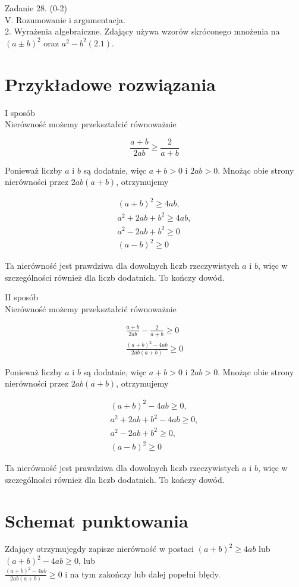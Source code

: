 \documentclass[10pt]{article}
\begin{document}
Zadanie 28. (0-2)\\
V. Rozumowanie i argumentacja.\\
2. Wyrażenia algebraiczne. Zdający używa wzorów skróconego mnożenia na $(a \pm b)^{2}$ oraz $a^{2}-b^{2}(2.1)$.

\section*{Przykładowe rozwiązania}
I sposób\\
Nierówność możemy przekształcić równoważnie

$$
\frac{a+b}{2 a b} \geq \frac{2}{a+b}
$$

Ponieważ liczby $a$ i $b$ są dodatnie, więc $a+b>0$ i $2 a b>0$. Mnożąc obie strony nierówności przez $2 a b(a+b)$, otrzymujemy

$$
\begin{gathered}
(a+b)^{2} \geq 4 a b, \\
a^{2}+2 a b+b^{2} \geq 4 a b, \\
a^{2}-2 a b+b^{2} \geq 0 \\
(a-b)^{2} \geq 0
\end{gathered}
$$

Ta nierówność jest prawdziwa dla dowolnych liczb rzeczywistych $a$ i $b$, więc w szczególności również dla liczb dodatnich. To kończy dowód.

II sposób\\
Nierówność możemy przekształcić równoważnie

$$
\begin{gathered}
\frac{a+b}{2 a b}-\frac{2}{a+b} \geq 0 \\
\frac{(a+b)^{2}-4 a b}{2 a b(a+b)} \geq 0
\end{gathered}
$$

Ponieważ liczby $a$ i $b$ są dodatnie, więc $a+b>0$ i $2 a b>0$. Mnożąc obie strony nierówności przez $2 a b(a+b)$, otrzymujemy

$$
\begin{gathered}
(a+b)^{2}-4 a b \geq 0, \\
a^{2}+2 a b+b^{2}-4 a b \geq 0, \\
a^{2}-2 a b+b^{2} \geq 0, \\
(a-b)^{2} \geq 0
\end{gathered}
$$

Ta nierówność jest prawdziwa dla dowolnych liczb rzeczywistych $a$ i $b$, więc w szczególności również dla liczb dodatnich. To kończy dowód.

\section*{Schemat punktowania}
 Zdający otrzymujegdy zapisze nierówność w postaci $(a+b)^{2} \geq 4 a b$ lub $(a+b)^{2}-4 a b \geq 0$, lub\\
$\frac{(a+b)^{2}-4 a b}{2 a b(a+b)} \geq 0$ i na tym zakończy lub dalej popełni błędy.
\end{document}
